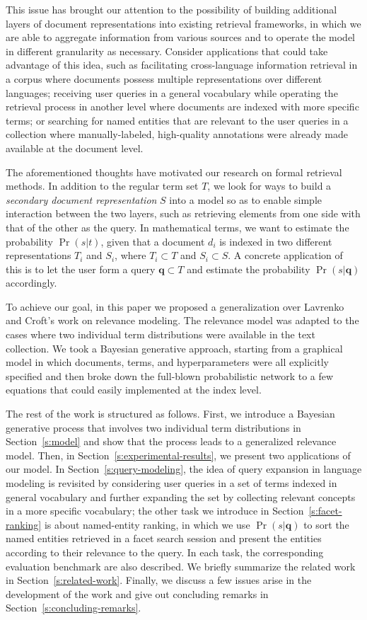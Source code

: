 This issue has brought our attention to the possibility of building additional
layers of document representations into existing retrieval frameworks, in which
we are able to aggregate information from various sources and to operate the
model in different granularity as necessary.  Consider applications that could
take advantage of this idea, such as facilitating cross-language information
retrieval in a corpus where documents possess multiple representations over
different languages; receiving user queries in a general vocabulary while
operating the retrieval process in another level where documents are indexed
with more specific terms; or searching for named entities that are relevant to the
user queries in a collection where manually-labeled, high-quality annotations
were already made available at the document level.  

The aforementioned thoughts have motivated our research on formal retrieval
methods.  In addition to the regular term set $T$, we look {for} ways to build
a {\it secondary document representation} $S$ into a model so as to enable
simple interaction between the two layers, such as retrieving elements from one
side with that of the other as the query.  In mathematical terms, we want to
estimate the probability $\Pr(s|t)$, given that a document $d_i$ is indexed in
two different representations $T_i$ and $S_i$, where $T_i \subset T$ and $S_i
\subset S$.  A concrete application of this is to let the user form a query
$\mathbf{q} \subset T$ and estimate the probability $\Pr(s|\mathbf{q})$
accordingly.

To achieve our goal, in this paper we proposed a generalization over Lavrenko
and Croft's work \cite{lavrenko2001relevance} on relevance modeling.  The
relevance model was adapted to the cases where two individual term
distributions were available in the text collection.  We took a Bayesian
generative approach, starting from a graphical model in which documents, terms,
and hyperparameters were all explicitly specified and then broke down the
full-blown probabilistic network to a few equations that could easily
implemented at the index level.  

The rest of the work is structured as follows.  First, we introduce a Bayesian
generative process that involves two individual term distributions in
Section~\ref{s:model} and show that the process leads to a generalized relevance
model.  Then, in Section~\ref{s:experimental-results}, we present two
applications of our model.  In Section~\ref{s:query-modeling}, the idea of
query expansion in language modeling is revisited by considering user queries
in a set of terms indexed in general vocabulary and further expanding the set
by collecting relevant concepts in a more specific vocabulary; the other task
we introduce in Section~\ref{s:facet-ranking} is about named-entity ranking, in
which we use $\Pr(s|\mathbf{q})$ to sort the named entities retrieved in a facet search
session and present the entities according to their relevance to the query.  In
each task, the corresponding evaluation benchmark are also described.  We
briefly summarize the related work in Section~\ref{s:related-work}.  Finally,
we discuss a few issues arise in the development of the work and give out
concluding remarks in Section~\ref{s:concluding-remarks}.

